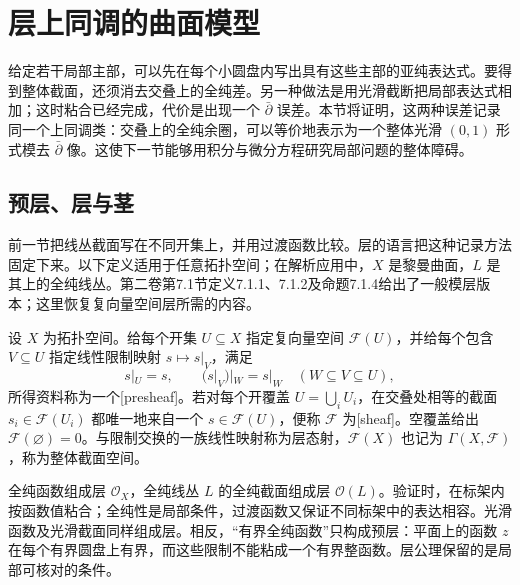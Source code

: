 
% 
% 

\section{层上同调的曲面模型}
\label{g4:sec:0302}

给定若干局部主部，可以先在每个小圆盘内写出具有这些主部的亚纯表达式。要得到整体截面，还须消去交叠上的全纯差。另一种做法是用光滑截断把局部表达式相加；这时粘合已经完成，代价是出现一个 \(\bar\partial\) 误差。本节将证明，这两种误差记录同一个上同调类：交叠上的全纯余圈，可以等价地表示为一个整体光滑 \((0,1)\) 形式模去 \(\bar\partial\) 像。这使下一节能够用积分与微分方程研究局部问题的整体障碍。

\subsection{预层、层与茎}
\label{g4:subsec:0302:01}

前一节把线丛截面写在不同开集上，并用过渡函数比较。层的语言把这种记录方法固定下来。以下定义适用于任意拓扑空间；在解析应用中，\(X\) 是黎曼曲面，\(L\) 是其上的全纯线丛。第二卷第7.1节定义7.1.1、7.1.2及命题7.1.4给出了一般模层版本；这里恢复复向量空间层所需的内容。

\begin{definition}
\label{g4:def:0302:sheaf}
设 \(X\) 为拓扑空间。给每个开集 \(U\subseteq X\) 指定复向量空间 \(\mathcal F(U)\)，并给每个包含 \(V\subseteq U\) 指定线性限制映射 \(s\mapsto s|_V\)，满足
\[
 s|_U=s,\qquad (s|_V)|_W=s|_W\quad(W\subseteq V\subseteq U),
\]
所得资料称为一个[presheaf]。若对每个开覆盖 \(U=\bigcup_i U_i\)，在交叠处相等的截面 \(s_i\in\mathcal F(U_i)\) 都唯一地来自一个 \(s\in\mathcal F(U)\)，便称 \(\mathcal F\) 为[sheaf]。空覆盖给出 \(\mathcal F(\varnothing)=0\)。与限制交换的一族线性映射称为层态射，\(\mathcal F(X)\) 也记为 \(\Gamma(X,\mathcal F)\)，称为整体截面空间。
\end{definition}

全纯函数组成层 \(\mathcal O_X\)，全纯线丛 \(L\) 的全纯截面组成层 \(\mathcal O(L)\)。验证时，在标架内按函数值粘合；全纯性是局部条件，过渡函数又保证不同标架中的表达相容。光滑函数及光滑截面同样组成层。相反，“有界全纯函数”只构成预层：平面上的函数 \(z\) 在每个有界圆盘上有界，而这些限制不能粘成一个有界整函数。层公理保留的是局部可核对的条件。


